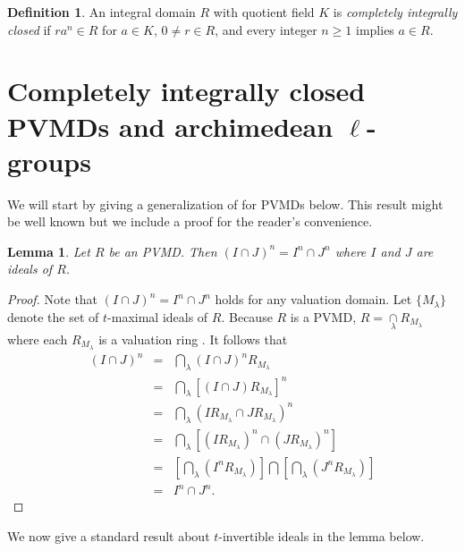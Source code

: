 \documentclass[12pt]{amsart}
\newtheorem{lemma}[theorem]{Lemma}
\theoremstyle{definition}\newtheorem{remark}[theorem]{Remark}
\theoremstyle{definition}\newtheorem{definition}[theorem]{Definition}
\begin{document}
\begin{definition}
An integral domain $R$ with quotient field $K$ is \textit{completely integrally
closed} if $ra^n \in R$ for $a \in K$, $0 \neq  r \in R$, and every integer $n \geq 1$ implies
$a \in R$. 
\end{definition}




\section{Completely integrally closed PVMDs and archimedean $\ell$-groups}



We will start by giving a generalization of \cite[Theorem 2.2 ($a\Rightarrow b)$]{Gilmer1972} for PVMDs below. This result might be well known but we include a proof for the reader's convenience.
\begin{lemma}\label{lemABn}
Let $R$ be an  PVMD. Then $(I \cap J)^n = I^n \cap J^n$ where $I$ and $J$ are ideals of $R$.

\end{lemma}

\begin{proof}
    Note that  $(I \cap J)^n = I^n \cap J^n$ holds for any valuation domain. Let $\{M_{\lambda}\}$ denote the set of $t$-maximal ideals of $R$. Because $R$ is a PVMD, $R=\mathop{\cap}\limits_{\lambda}R_{M_{\lambda}}$  where each $R_{M_{\lambda}}$ is a valuation ring \cite[Theorem 3.2.9, Corollary 3.2.12]{Elliott19}. It follows that
    \begin{eqnarray*}
    (I \cap J)^n & = & \mathop{\bigcap}\limits_{\lambda} (I \cap J)^nR_{M_{\lambda}} \\
    & = & \mathop{\bigcap}\limits_{\lambda}[ (I \cap J)R_{M_{\lambda}}]^n \\
    &=& \mathop{\bigcap}\limits_{\lambda} (IR_{M_{\lambda}} \cap JR_{M_{\lambda}})^n \\
    &=& \mathop{\bigcap}\limits_{\lambda} [(IR_{M_{\lambda}})^n \cap (JR_{M_{\lambda}})^n] \\
    &=& \left[\mathop{\bigcap}\limits_{\lambda} (I^nR_{M_{\lambda}})\right] \bigcap \left[\mathop{\bigcap}\limits_{\lambda} (J^nR_{M_{\lambda}})\right] \\
    & = & I^n \cap J^n.
    \end{eqnarray*}
\end{proof}
We now give a standard result about $t$-invertible ideals in the lemma below. 
\end{document}
